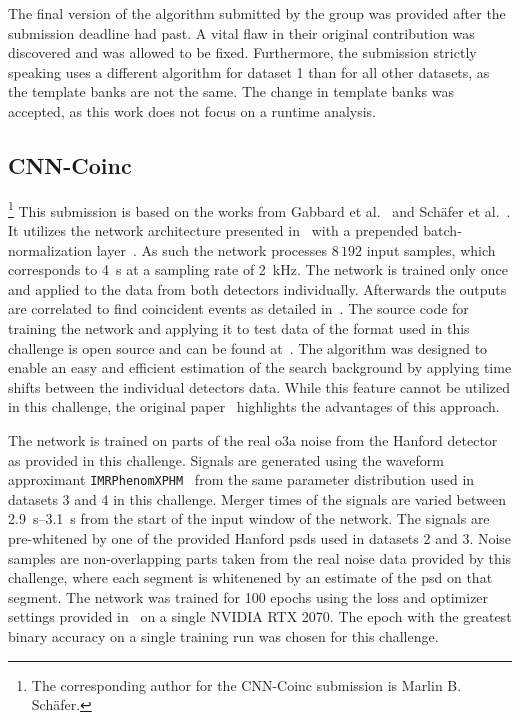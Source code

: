 The final version of the algorithm submitted by the \pycbc group was provided after the submission deadline had past. A vital flaw in their original contribution was discovered and was allowed to be fixed. Furthermore, the \pycbc submission strictly speaking uses a different algorithm for dataset 1 than for all other datasets, as the template banks are not the same. The change in template banks was accepted, as this work does not focus on a runtime analysis.


\subsection{CNN-Coinc}\label{sec:submission-cnn}
\footnote{The corresponding author for the CNN-Coinc submission is Marlin B. Sch{\"a}fer.}
This submission is based on the works from Gabbard et al.~\cite{Gabbard:2017lja} and Sch\"afer et al.~\cite{Schafer:2021cml}. It utilizes the network architecture presented in~\cite{Gabbard:2017lja} with a prepended batch-normalization layer~\cite{Ioffe:2015aaa}. As such the network processes $8\,192$ input samples, which corresponds to \SI{4}{\second} at a sampling rate of \SI{2}{\kilo\hertz}. The network is trained only once and applied to the data from both detectors individually. Afterwards the outputs are correlated to find coincident events as detailed in~\cite{Schafer:2021cml}. The source code for training the network and applying it to test data of the format used in this challenge is open source and can be found at~\cite{githubCnnCoinc}. The algorithm was designed to enable an easy and efficient estimation of the search background by applying time shifts between the individual detectors data. While this feature cannot be utilized in this challenge, the original paper~\cite{Schafer:2021cml} highlights the advantages of this approach.

The network is trained on parts of the real \acrshort{o3a} noise from the Hanford detector as provided in this challenge. Signals are generated using the waveform approximant \verb|IMRPhenomXPHM|~\cite{Pratten:2020ceb} from the same parameter distribution used in datasets 3 and 4 in this challenge. Merger times of the signals are varied between \SIrange{2.9}{3.1}{\second} from the start of the input window of the network. The signals are pre-whitened by one of the provided Hanford \acrshort{psd}s used in datasets 2 and 3. Noise samples are non-overlapping parts taken from the real noise data provided by this challenge, where each segment is whitenened by an estimate of the \acrshort{psd} on that segment. The network was trained for 100 epochs using the loss and optimizer settings provided in~\cite{Schafer:2021cml} on a single NVIDIA RTX 2070. The epoch with the greatest binary accuracy on a single training run was chosen for this challenge.

